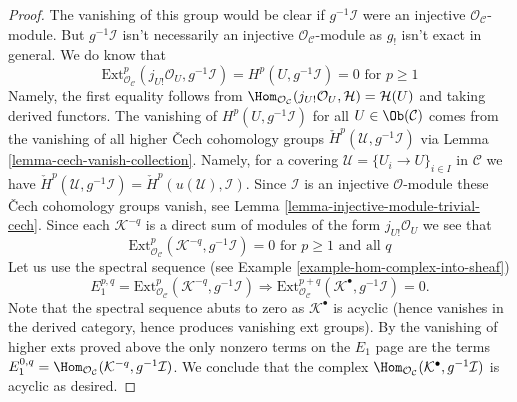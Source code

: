 \begin{proof}
\medskip\noindent
The vanishing of this group would be clear if $g^{-1}\mathcal{I}$
were an injective $\mathcal{O}_\mathcal{C}$-module. But
$g^{-1}\mathcal{I}$ isn't necessarily an injective
$\mathcal{O}_\mathcal{C}$-module as $g_!$ isn't exact in
general. We do know that
$$
\text{Ext}^p_{\mathcal{O}_\mathcal{C}}(
j_{U!}\mathcal{O}_U, g^{-1}\mathcal{I}) =
H^p(U, g^{-1}\mathcal{I}) = 0 \text{ for }p \geq 1
$$
Namely, the first equality follows from
$\Hom_{\mathcal{O}_\mathcal{C}}(j_{U!}\mathcal{O}_U, \mathcal{H}) =
\mathcal{H}(U)$ and taking derived functors. The vanishing of
$H^p(U, g^{-1}\mathcal{I})$ for all $U \in \Ob(\mathcal{C})$
comes from the vanishing of all higher {\v C}ech cohomology groups
$\check H^p(\mathcal{U}, g^{-1}\mathcal{I})$ via
Lemma \ref{lemma-cech-vanish-collection}.
Namely, for a covering $\mathcal{U} = \{U_i \to U\}_{i \in I}$
in $\mathcal{C}$ we have $\check H^p(\mathcal{U}, g^{-1}\mathcal{I}) =
\check H^p(u(\mathcal{U}), \mathcal{I})$. Since $\mathcal{I}$ is an injective
$\mathcal{O}$-module these {\v C}ech cohomology groups vanish, see
Lemma \ref{lemma-injective-module-trivial-cech}.
Since each $\mathcal{K}^{-q}$ is a direct sum of modules of the form
$j_{U!}\mathcal{O}_U$ we see that
$$
\text{Ext}^p_{\mathcal{O}_\mathcal{C}}(\mathcal{K}^{-q}, g^{-1}\mathcal{I}) = 0
\text{ for }p \geq 1\text{ and all }q
$$
Let us use the spectral sequence (see
Example
\ref{example-hom-complex-into-sheaf})
$$
E_1^{p, q} = \text{Ext}^p_{\mathcal{O}_\mathcal{C}}(
\mathcal{K}^{-q}, g^{-1}\mathcal{I})
\Rightarrow
\text{Ext}^{p + q}_{\mathcal{O}_\mathcal{C}}(
\mathcal{K}^\bullet, g^{-1}\mathcal{I}) = 0.
$$
Note that the spectral sequence abuts to zero as $\mathcal{K}^\bullet$
is acyclic (hence vanishes in the derived category, hence produces
vanishing ext groups). By the vanishing of higher exts proved above
the only nonzero terms on the $E_1$ page are the terms
$E_1^{0, q} = \Hom_{\mathcal{O}_\mathcal{C}}(
\mathcal{K}^{-q}, g^{-1}\mathcal{I})$.
We conclude that the complex
$\Hom_{\mathcal{O}_\mathcal{C}}(
\mathcal{K}^\bullet, g^{-1}\mathcal{I})$
is acyclic as desired.


\end{proof}
